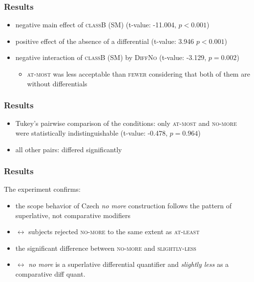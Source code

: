 \documentclass[10pt
]{beamer}
\newcommand{\cond}[1]{\textsc{#1}}
\begin{document}
\begin{frame}
  \frametitle{Results}

  \begin{itemize}
    \item negative main effect of \cond{classB} (SM) (t-value: -11.004, $p < 0.001$)
    \item positive effect of the absence of a differential (t-value: 3.946 $p < 0.001$)
    \item negative interaction of \textsc{classB} (SM) by \cond{DiffNo} (t-value: -3.129, $p =  0.002$)
    \begin{itemize}
      \item \cond{at-most} was less acceptable than \cond{fewer} considering that both of them are without differentials
    \end{itemize}
  \end{itemize}

\end{frame}

\begin{frame}
  \frametitle{Results}

  \begin{itemize}
    \item Tukey's pairwise comparison of the conditions: only \cond{at-most} and \cond{no-more} were statistically indistinguishable (t-value: -0.478, $p = 0.964$)
    \item all other pairs:  differed significantly
  \end{itemize}

\end{frame}


\begin{frame}
  \frametitle{Results}

The experiment confirms:

\begin{itemize}
  \item the scope behavior of Czech \textit{no more} construction follows the pattern of superlative, not comparative modifiers
  \item $\leftrightarrow$ subjects rejected \cond{no-more} to the same extent as \cond{at-least}
  \item the significant difference between \cond{no-more} and \cond{slightly-less}
  \item $\leftrightarrow$ \textit{no more} is a superlative differential quantifier and \textit{slightly less} as a comparative diff quant.
\end{itemize}

\end{frame}
\end{document}
